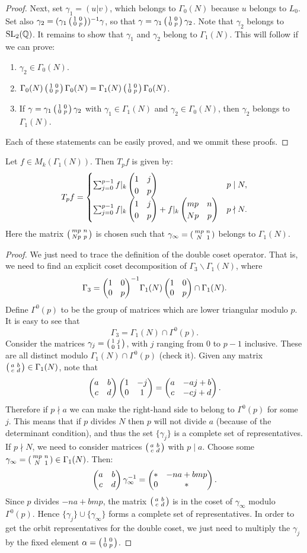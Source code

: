 \begin{proof}
Next,  set $\gamma_1=(u|v)$, which belongs to $\Gamma_0(N)$ because $u$ belongs to $L_0$. Set also $\gamma_2=(\gamma_1\left(\begin{smallmatrix}1&0\\0&p\end{smallmatrix}\right))^{-1}\gamma$, so that $\gamma=\gamma_1\left(\begin{smallmatrix}1&0\\0&p\end{smallmatrix}\right)\gamma_2$. Note that $\gamma_2$ belongs to $\operatorname{SL}_2(\mathbb{Q})$. It remains to show that $\gamma_1$ and $\gamma_2$ belong to $\Gamma_1(N)$. This will follow if we can prove:
\begin{enumerate}
\item $\gamma_2\in \Gamma_0(N)$.
\item $\Gamma_0(N)\left(\begin{smallmatrix}1&0\\0&p\end{smallmatrix}\right) \Gamma_0(N)=\Gamma_1(N)\left(\begin{smallmatrix}1&0\\0&p\end{smallmatrix}\right)\Gamma_0(N)$.
\item If $\gamma=\gamma_1\left(\begin{smallmatrix}1&0\\0&p\end{smallmatrix}\right)\gamma_2$ with $\gamma_1\in \Gamma_1(N)$ and $\gamma_2\in \Gamma_0(N)$, then $\gamma_2$ belongs to $\Gamma_1(N)$.
\end{enumerate}
Each of these statements can be easily proved, and we ommit these proofs.
\end{proof}

\begin{proposition}
\label{prop:description-hecke}
  Let $f\in M_k(\Gamma_1(N))$. Then $T_p f$ is given by:
\[
T_p f =
\begin{cases}
\sum_{j=0}^{p-1} f|_k \left(\begin{matrix}1&j\\0&p\end{matrix}\right)&p\mid N,\\
\sum_{j=0}^{p-1} f|_k\left(\begin{matrix}1&j\\0&p\end{matrix}\right) +f|_k\left(\begin{matrix}mp&n\\Np&p\end{matrix}\right)&p\nmid N.
\end{cases}
\]
Here the matrix $\left(\begin{smallmatrix}mp&n\\Np&p\end{smallmatrix}\right)$ is chosen such that $\gamma_\infty=\left(\begin{smallmatrix}mp&n\\N&1\end{smallmatrix}\right)$ belongs to $\Gamma_1(N)$.
\end{proposition}
\begin{proof}
  We just need to trace the definition of the double coset operator. That is, we need to find an explicit coset decomposition of $\Gamma_3\backslash \Gamma_1(N)$, where
\[
\Gamma_3={\left(\begin{matrix}1&0\\0&p\end{matrix}\right)}^{-1} \Gamma_1(N) \left(\begin{matrix}1&0\\0&p\end{matrix}\right) \cap \Gamma_1(N).
\]
Define $\Gamma^0(p)$ to be the group of matrices which are lower triangular modulo $p$. It is easy to see that
\[
\Gamma_3 = \Gamma_1(N)\cap \Gamma^0(p).
\]
Consider the matrices $\gamma_j=\left(\begin{smallmatrix}1&j\\0&1\end{smallmatrix}\right)$, with $j$ ranging from $0$ to $p-1$ inclusive. These are all distinct modulo $\Gamma_1(N)\cap \Gamma^0(p)$ (check it). Given any matrix $\left(\begin{smallmatrix}a&b\\c&d\end{smallmatrix}\right) \in\Gamma_1(N)$, note that
\[
\left(\begin{matrix}a&b\\c&d\end{matrix}\right) \left(\begin{matrix}1&-j\\0&1\end{matrix}\right) = \left(\begin{matrix}a&-aj+b\\c&-cj+d\end{matrix}\right).
\]
Therefore if $p\nmid a$ we can make the right-hand side to belong to $\Gamma^0(p)$ for some $j$. This means that if $p$ divides $N$ then $p$ will not divide $a$ (because of the determinant condition), and thus the set $\{\gamma_j\}$ is a complete set of representatives. If $p\nmid N$, we need to consider matrices $\left(\begin{smallmatrix}a&b\\c&d\end{smallmatrix}\right)$ with $p\mid a$. Choose some $\gamma_\infty=\left(\begin{smallmatrix}mp&n\\N&1\end{smallmatrix}\right)\in\Gamma_1(N)$. Then:
\[
\left(\begin{matrix}a&b\\c&d\end{matrix}\right) \gamma_\infty^{-1} = \left(\begin{matrix}*&-na+bmp\\0&*\end{matrix}\right).
\]
Since $p$ divides $-na+bmp$, the matrix $\left(\begin{smallmatrix}a&b\\c&d\end{smallmatrix}\right)$ is in the coset of $\gamma_\infty$ modulo $\Gamma^0(p)$. Hence $\{\gamma_j\}\cup \{\gamma_\infty\}$ forms a complete set of representatives. In order to get the orbit representatives for the double coset, we just need to multiply the $\gamma_j$ by the fixed element $\alpha = \left(\begin{smallmatrix}1&0\\0&p\end{smallmatrix}\right)$.
\end{proof}

